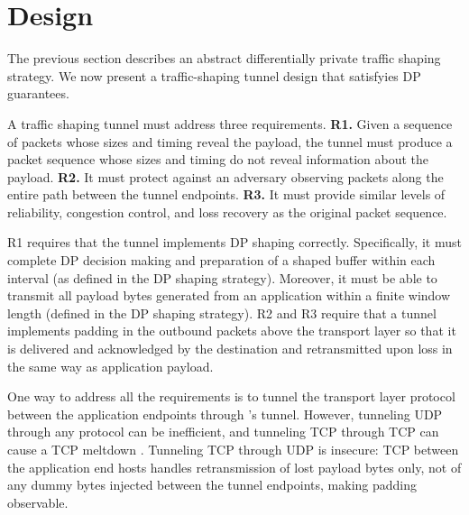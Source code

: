 \section{Design}
\label{sec:design}

The previous section describes an abstract differentially private traffic
shaping strategy.
We now present a traffic-shaping tunnel design that satisfyies DP guarantees.

A traffic shaping tunnel must address three requirements.
{\bf R1.} Given a sequence of packets whose sizes and timing reveal the payload,
the tunnel must produce a packet sequence whose sizes and timing do not reveal
information about the payload.
{\bf R2.} It must protect against an adversary observing packets
along the entire path between the tunnel endpoints.
{\bf R3.} It must provide similar levels of reliability, congestion control, and
loss recovery as the original packet sequence.

R1 requires that the tunnel implements DP shaping correctly. Specifically,
it must complete DP decision making and preparation of a shaped buffer within
each interval (as defined in the DP shaping strategy). Moreover, it must be able
to transmit all payload bytes generated from an application within a finite
window length (defined in the DP shaping strategy).
R2 and R3 require that a tunnel implements padding in the outbound packets above
the transport layer so that it is delivered and acknowledged by the destination
and retransmitted upon loss in the same way as application payload.

One way to address all the requirements is to tunnel the transport layer
protocol between the application endpoints through {\sys}'s tunnel.
However, tunneling UDP through any protocol can be inefficient,
and tunneling
TCP through TCP can cause a TCP meltdown \cite{honda2005tcpovertcp,
tcp-meltdown}.
Tunneling TCP through UDP is insecure: TCP between the application end hosts
handles retransmission of lost payload bytes only,
not of any dummy bytes injected between the tunnel endpoints, making padding
observable.
\fi

